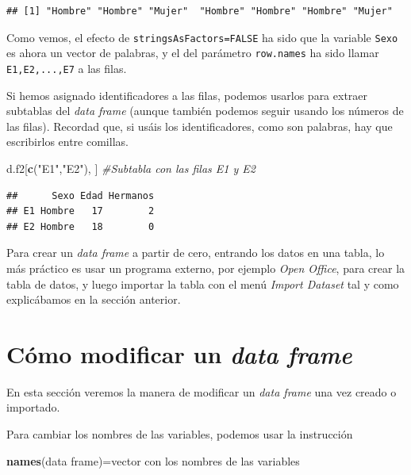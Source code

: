\documentclass[]{book}
\newenvironment{Shaded}{\begin{snugshade}}{\end{snugshade}}
\newcommand{\CommentTok}[1]{\textcolor[rgb]{0.56,0.35,0.01}{\textit{#1}}}
\newcommand{\KeywordTok}[1]{\textcolor[rgb]{0.13,0.29,0.53}{\textbf{#1}}}
\newcommand{\NormalTok}[1]{#1}
\newcommand{\StringTok}[1]{\textcolor[rgb]{0.31,0.60,0.02}{#1}}
\theoremstyle{definition}
\theoremstyle{definition}
\theoremstyle{definition}
\theoremstyle{remark}
\begin{document}
\begin{verbatim}
## [1] "Hombre" "Hombre" "Mujer"  "Hombre" "Hombre" "Hombre" "Mujer"
\end{verbatim}

Como vemos, el efecto de \texttt{stringsAsFactors=FALSE} ha sido que la variable \texttt{Sexo} es ahora un vector de palabras, y el del parámetro \texttt{row.names} ha sido llamar \texttt{E1,E2,...,E7} a las filas.

Si hemos asignado identificadores a las filas, podemos usarlos para extraer subtablas del \emph{data frame} (aunque también podemos seguir usando los números de las filas). Recordad que, si usáis los identificadores, como son palabras, hay que escribirlos entre comillas.

\begin{Shaded}
\begin{Highlighting}[]
\NormalTok{d.f2[}\KeywordTok{c}\NormalTok{(}\StringTok{"E1"}\NormalTok{,}\StringTok{"E2"}\NormalTok{), ] }\CommentTok{#Subtabla con las filas E1 y E2}
\end{Highlighting}
\end{Shaded}

\begin{verbatim}
##      Sexo Edad Hermanos
## E1 Hombre   17        2
## E2 Hombre   18        0
\end{verbatim}

Para crear un \emph{data frame} a partir de cero, entrando los datos en una tabla, lo más práctico es usar un programa externo, por ejemplo \emph{Open Office}, para crear la tabla de datos, y luego importar la tabla con el menú \emph{Import Dataset} tal y como explicábamos en la sección anterior.

\hypertarget{sec:moddf}{%
\section{\texorpdfstring{Cómo modificar un \emph{data frame}}{Cómo modificar un data frame}}\label{sec:moddf}}

En esta sección veremos la manera de modificar un \emph{data frame} una vez creado o importado.

Para cambiar los nombres de las variables, podemos usar la instrucción

\begin{Shaded}
\begin{Highlighting}[]
\KeywordTok{names}\NormalTok{(data frame)=vector con los nombres de las variables}
\end{Highlighting}
\end{Shaded}
\end{document}
